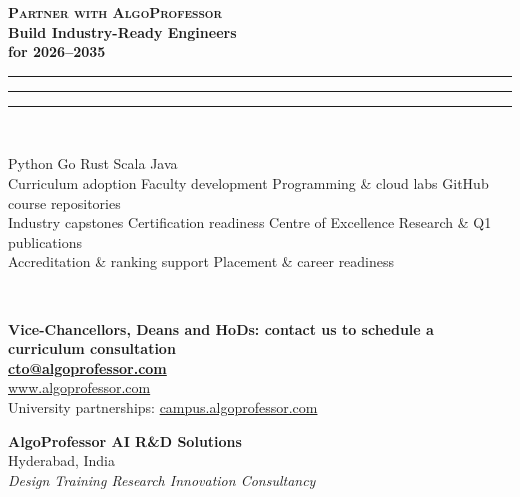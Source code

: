 \vspace*{62mm}
\begin{center}
{\color{saffron!85!black}\large\bfseries\textsc{Partner with AlgoProfessor}}\\[10pt]
{\color{chakra}\fontsize{26}{32}\selectfont\bfseries Build Industry-Ready Engineers\\[4pt] for 2026--2035}\\[10pt]
{\color{saffron}\rule{0.16\linewidth}{2pt}}{\color{white!80!black}\rule{0.16\linewidth}{2pt}}{\color{indiagreen}\rule{0.16\linewidth}{2pt}}\\[14pt]
\begin{minipage}{0.82\textwidth}\centering\color{ink}
Python \;\textbullet\; Go \;\textbullet\; Rust \;\textbullet\; Scala \;\textbullet\; Java\\[4pt]Curriculum adoption \;\textbullet\; Faculty development \;\textbullet\; Programming \& cloud labs \;\textbullet\; GitHub course repositories\\[2pt]
Industry capstones \;\textbullet\; Certification readiness \;\textbullet\; Centre of Excellence \;\textbullet\; Research \& Q1 publications\\[2pt]
Accreditation \& ranking support \;\textbullet\; Placement \& career readiness
\end{minipage}\\[22pt]

\begin{tcolorbox}[enhanced,width=0.72\textwidth,colback=white,colframe=chakra,boxrule=1pt,arc=3pt,
  borderline north={4pt}{0pt}{saffron},borderline south={4pt}{0pt}{indiagreen},halign=center,
  left=10pt,right=10pt,top=10pt,bottom=10pt]
{\color{chakra}\large\bfseries Vice-Chancellors, Deans and HoDs: contact us to schedule a curriculum consultation}\\[12pt]
{\color{saffron!85!black}\Large\bfseries \href{mailto:cto@algoprofessor.com}{cto@algoprofessor.com}}\\[8pt]
{\color{chakra}\large \href{https://www.algoprofessor.com}{www.algoprofessor.com}}\\[8pt]
{\color{ink}\small University partnerships: \href{https://campus.algoprofessor.com}{campus.algoprofessor.com}}
\end{tcolorbox}

\vspace{18pt}
{\color{chakra}\large\bfseries AlgoProfessor AI R\&D Solutions}\\[3pt]
{\color{ink}Hyderabad, India}\\[10pt]
{\color{indiagreen!80!black}\small\itshape Design \;\textbullet\; Training \;\textbullet\; Research \;\textbullet\; Innovation \;\textbullet\; Consultancy}
\end{center}
